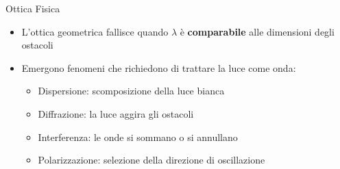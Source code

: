 \begin{frame}{Ottica Fisica}
    \begin{itemize}
        \item L'ottica geometrica fallisce quando $\lambda$ è \textbf{comparabile} alle dimensioni degli ostacoli
        \item  Emergono fenomeni che richiedono di trattare la luce come onda:
        \begin{itemize}
            \item Dispersione: scomposizione della luce bianca
            \item Diffrazione: la luce aggira gli ostacoli
            \item Interferenza: le onde si sommano o si annullano
            \item Polarizzazione: selezione della direzione di oscillazione
        \end{itemize}
    \end{itemize}
\end{frame}




